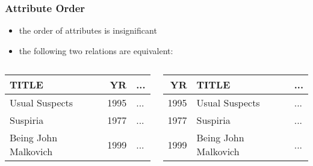 \documentclass[dvipsnames]{beamer}
\theoremstyle{plain}
\begin{document}
\begin{frame}
  \frametitle{Attribute Order}

  \begin{itemize}
    \item the order of attributes is insignificant
  \end{itemize}

  \pause
  \begin{example}
    \begin{itemize}
      \item the following two relations are equivalent:
    \end{itemize}

    \begin{columns}
      \begin{tiny}
      \begin{table}
        \begin{tabular}{|l|r|l|}\hline
TITLE                &   YR & ... \\\hline\hline
Usual Suspects       & 1995 & ... \\\hline
Suspiria             & 1977 & ... \\\hline
Being John Malkovich & 1999 & ... \\\hline
        \end{tabular}
      \end{table}
      \end{tiny}

      \begin{tiny}
      \begin{table}
        \begin{tabular}{|r|l|l|}\hline
  YR & TITLE                & ... \\\hline\hline
1995 & Usual Suspects       & ... \\\hline
1977 & Suspiria             & ... \\\hline
1999 & Being John Malkovich & ... \\\hline
        \end{tabular}
      \end{table}
      \end{tiny}
    \end{columns}
  \end{example}
\end{frame}
\end{document}
